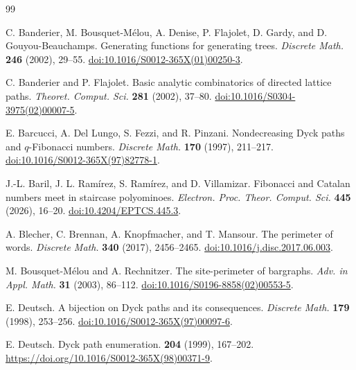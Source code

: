 \documentclass[12pt]{amsart}
\theoremstyle{plain}
\theoremstyle{definition}
\begin{document}
\begin{thebibliography}{99}

C. Banderier, M. Bousquet-M{\'e}lou, A. Denise, P. Flajolet,
D. Gardy, and D. Gouyou-Beauchamps.
\newblock Generating functions for generating trees.
\newblock \emph{Discrete Math.} \textbf{246} (2002), 29--55.
\newblock \href{https://doi.org/10.1016/S0012-365X(01)00250-3}
{doi:10.1016/S0012-365X(01)00250-3}.

C. Banderier and P. Flajolet.
\newblock Basic analytic combinatorics of directed lattice paths.
\newblock \emph{Theoret. Comput. Sci.} \textbf{281} (2002), 37--80.
\newblock \href{https://doi.org/10.1016/S0304-3975(02)00007-5}
{doi:10.1016/S0304-3975(02)00007-5}.

E. Barcucci, A. Del Lungo, S. Fezzi, and R. Pinzani.
\newblock Nondecreasing Dyck paths and $q$-Fibonacci numbers.
\newblock \emph{Discrete Math.} \textbf{170} (1997), 211--217.
\newblock \href{https://doi.org/10.1016/S0012-365X(97)82778-1}
{doi:10.1016/S0012-365X(97)82778-1}.


J.-L. Baril, J. L. Ram\'irez, S. Ram\'irez, and D. Villamizar.
\newblock Fibonacci and Catalan numbers meet in staircase polyominoes.
\newblock \emph{Electron. Proc. Theor. Comput. Sci.} \textbf{445} (2026), 16--20.
\newblock \href{https://doi.org/10.4204/EPTCS.445.3}
{doi:10.4204/EPTCS.445.3}.



A. Blecher, C. Brennan, A. Knopfmacher, and T. Mansour.
\newblock The perimeter of words.
\newblock \emph{Discrete Math.} \textbf{340} (2017), 2456--2465.
\newblock \href{https://doi.org/10.1016/j.disc.2017.06.003}
{doi:10.1016/j.disc.2017.06.003}.

M. Bousquet-M{\'e}lou and A. Rechnitzer.
\newblock The site-perimeter of bargraphs.
\newblock \emph{Adv. in Appl. Math.} \textbf{31} (2003), 86--112.
\newblock \href{https://doi.org/10.1016/S0196-8858(02)00553-5}
{doi:10.1016/S0196-8858(02)00553-5}.

E. Deutsch.
\newblock A bijection on Dyck paths and its consequences.
\newblock \emph{Discrete Math.} \textbf{179} (1998), 253--256.
\newblock \href{https://doi.org/10.1016/S0012-365X(97)00097-6}
{doi:10.1016/S0012-365X(97)00097-6}.


E. Deutsch.
\newblock Dyck path enumeration.
 \textbf{204} (1999), 167--202.
\newblock \url{https://doi.org/10.1016/S0012-365X(98)00371-9}.




\end{thebibliography}
\end{document}
